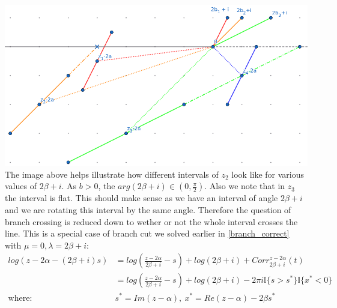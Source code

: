 \documentclass{article}
\begin{document}
\includegraphics[width=\textwidth]{z23}
The image above helps illustrate how different intervals of $z_2$ look like for various values of $2\beta+i$.
As $b>0$, the $arg(2\beta+i)\in(0,\frac{\pi}{2})$.
Also we note that in $z_3$ the interval is flat.
This should make sense as we have an interval of angle $2\beta+i$ and we are rotating this interval by the same angle.
Therefore the question of branch crossing is reduced down to wether or not the whole interval crosses the line.
This is a special case of branch cut we solved earlier in \eqref{branch_correct} with $\mu=0,\lambda=2\beta+i$:
\begin{align}
    log(z-2\alpha-(2\beta+i)s)&=log(\frac{z-2\alpha}{2\beta+i}-s)+log(2\beta+i)+Corr_{2\beta+i}^{z-2\alpha}(t)\\
    &=log(\frac{z-2\alpha}{2\beta+i}-s)+log(2\beta+i)-2\pi i\mathbb{I}\{s>s^*\}\mathbb{I}\{x^*<0\}\\
    \text{where: }& s^*=Im(z-\alpha),\:x^*=Re(z-\alpha)-2\beta s^*
\end{align}
\end{document}
